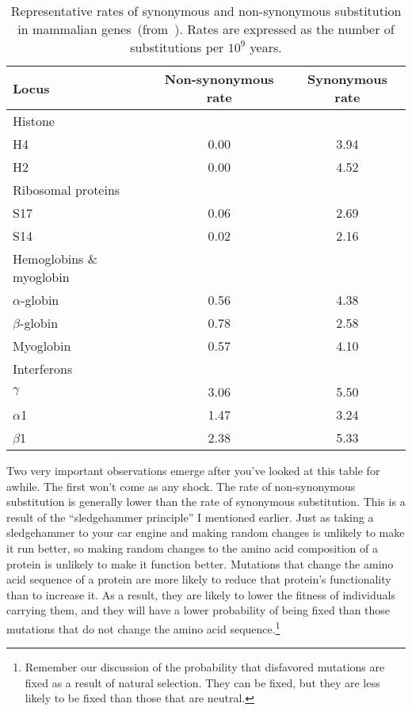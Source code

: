 \begin{table}
\begin{center}
\begin{tabular}{lcc}
\hline\hline
Locus     & Non-synonymous rate & Synonymous rate \\
\hline
Histone \\
\quad H4  & 0.00                & 3.94 \\
\quad H2  & 0.00                & 4.52 \\
Ribosomal proteins \\
\quad S17 & 0.06                & 2.69 \\
\quad S14 & 0.02                & 2.16 \\
Hemoglobins \& myoglobin \\
\quad $\alpha$-globin & 0.56    & 4.38 \\
\quad $\beta$-globin  & 0.78    & 2.58 \\
\quad Myoglobin       & 0.57    & 4.10 \\
Interferons \\
\quad $\gamma$  & 3.06          & 5.50 \\
\quad $\alpha$1 & 1.47          & 3.24 \\
\quad $\beta$1  & 2.38          & 5.33 \\
\hline
\end{tabular}
\end{center}
\caption{Representative rates of synonymous and non-synonymous
  substitution in mammalian genes~(from~\cite{Li97}). Rates are
  expressed as the number of substitutions per $10^9$
  years.}\label{table:substitution-data}
\end{table}

Two very important observations emerge after you've looked at this
table for awhile. The first won't come as any shock. The rate of
non-synonymous substitution is generally lower than the rate of
synonymous substitution. This is a result of the ``sledgehammer
principle'' I mentioned earlier. Just as taking a sledgehammer to your
car engine and making random changes is unlikely to make it run
better, so making random changes to the amino acid composition of a
protein is unlikely to make it function better. Mutations that change
the amino acid sequence of a protein are more likely to reduce that
protein's functionality than to increase it. As a result, they are
likely to lower the fitness of individuals carrying them, and they
will have a lower probability of being fixed than those mutations that
do not change the amino acid sequence.\footnote{Remember 
our discussion of the probability that disfavored mutations are fixed
as a result of natural selection. They can be fixed, but they are less
likely to be fixed than those that are neutral.}
  
